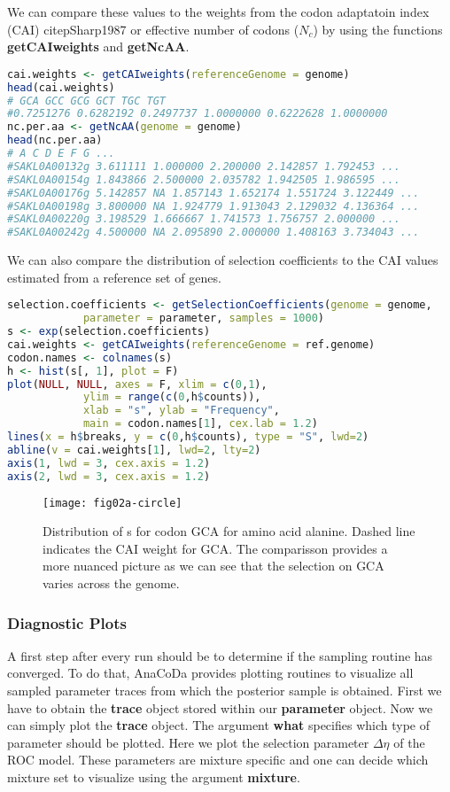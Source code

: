We can compare these values to the weights from the codon adaptatoin index (CAI) citep{Sharp1987} or
effective number of codons ($N_c$) \citep{Wright1990} by using the functions \textbf{getCAIweights} and \textbf{getNcAA}.

\begin{lstlisting}[language=R]
cai.weights <- getCAIweights(referenceGenome = genome)
head(cai.weights)
# GCA GCC GCG GCT TGC TGT
#0.7251276 0.6282192 0.2497737 1.0000000 0.6222628 1.0000000
nc.per.aa <- getNcAA(genome = genome)
head(nc.per.aa)
# A C D E F G ...
#SAKL0A00132g 3.611111 1.000000 2.200000 2.142857 1.792453 ...
#SAKL0A00154g 1.843866 2.500000 2.035782 1.942505 1.986595 ...
#SAKL0A00176g 5.142857 NA 1.857143 1.652174 1.551724 3.122449 ...
#SAKL0A00198g 3.800000 NA 1.924779 1.913043 2.129032 4.136364 ...
#SAKL0A00220g 3.198529 1.666667 1.741573 1.756757 2.000000 ...
#SAKL0A00242g 4.500000 NA 2.095890 2.000000 1.408163 3.734043 ...
\end{lstlisting}

We can also compare the distribution of selection coefficients to the CAI values estimated from a reference set of
genes.

\begin{lstlisting}[language=R]
selection.coefficients <- getSelectionCoefficients(genome = genome,
			parameter = parameter, samples = 1000)
s <- exp(selection.coefficients)
cai.weights <- getCAIweights(referenceGenome = ref.genome)
codon.names <- colnames(s)
h <- hist(s[, 1], plot = F)
plot(NULL, NULL, axes = F, xlim = c(0,1), 
			ylim = range(c(0,h$counts)),
			xlab = "s", ylab = "Frequency", 
			main = codon.names[1], cex.lab = 1.2)
lines(x = h$breaks, y = c(0,h$counts), type = "S", lwd=2)
abline(v = cai.weights[1], lwd=2, lty=2)
axis(1, lwd = 3, cex.axis = 1.2)
axis(2, lwd = 3, cex.axis = 1.2)
\end{lstlisting}

\begin{figure}[h]
  \centering
  \texttt{[image: fig02a-circle]}\\
  \caption{Distribution of s for codon GCA for amino acid alanine. Dashed line indicates the CAI weight for
GCA. The comparisson provides a more nuanced picture as we can see that the selection on GCA varies
across the genome.}
  \label{fig:sne_dummy}
\end{figure} 

\subsubsection{Diagnostic Plots}
A first step after every run should be to determine if the sampling routine has converged. 
To do that, AnaCoDa provides plotting routines to visualize all sampled parameter traces from which the posterior sample is obtained.
First we have to obtain the \textbf{trace} object stored within our \textbf{parameter} object. 
Now we can simply plot the \textbf{trace} object. The argument \textbf{what} specifies which type of parameter should be plotted.
Here we plot the selection parameter $\Delta \eta$ of the ROC model. 
These parameters are mixture specific and one can decide which mixture set to visualize using the argument \textbf{mixture}.

